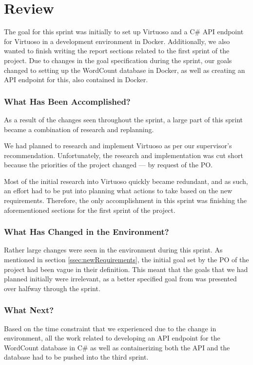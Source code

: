 \section{Review}
The goal for this sprint was initially to set up Virtuoso and a C\# API endpoint for Virtuoso in a development environment in Docker. 
Additionally, we also wanted to finish writing the report sections related to the first sprint of the \knox{} project. 
Due to changes in the goal specification during the sprint, our goals changed to setting up the WordCount database in Docker, as well as creating an API endpoint for this, also contained in Docker.

\subsubsection*{What Has Been Accomplished?}
As a result of the changes seen throughout the sprint, a large part of this sprint became a combination of research and replanning. 

We had planned to research and implement Virtuoso as per our supervisor's recommendation.
Unfortunately, the research and implementation was cut short because the priorities of the \knox{} project changed --- by request of the \knox{} PO.

Most of the initial research into Virtuoso quickly became redundant, and as such, an effort had to be put into planning what actions to take based on the new requirements. 
Therefore, the only accomplishment in this sprint was finishing the aforementioned sections for the first sprint of the \knox{} project.  



\subsubsection*{What Has Changed in the Environment?}
Rather large changes were seen in the environment during this sprint. As mentioned in section \ref{ssec:newRequirements}, the initial goal set by the PO of the \knox{} project had been vague in their definition. 
This meant that the goals that we had planned initially were irrelevant, as a better specified goal from \knox{} was presented over halfway through the sprint. 

\subsubsection*{What Next?}
Based on the time constraint that we experienced due to the change in environment, all the work related to developing an API endpoint for the WordCount database in C\# as well as containerizing both the API and the database had to be pushed into the third sprint.
